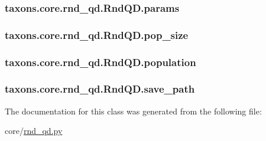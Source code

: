\subsubsection[{\texorpdfstring{params}{params}}]{\setlength{\rightskip}{0pt plus 5cm}taxons.\+core.\+rnd\+\_\+qd.\+Rnd\+Q\+D.\+params}\hypertarget{classtaxons_1_1core_1_1rnd__qd_1_1_rnd_q_d_ab7883ce78f8f699d4a2950128bf6dcbb}{}\label{classtaxons_1_1core_1_1rnd__qd_1_1_rnd_q_d_ab7883ce78f8f699d4a2950128bf6dcbb}
\subsubsection[{\texorpdfstring{pop\+\_\+size}{pop_size}}]{\setlength{\rightskip}{0pt plus 5cm}taxons.\+core.\+rnd\+\_\+qd.\+Rnd\+Q\+D.\+pop\+\_\+size}\hypertarget{classtaxons_1_1core_1_1rnd__qd_1_1_rnd_q_d_acdb4373d63480ea935f930d1922a00ed}{}\label{classtaxons_1_1core_1_1rnd__qd_1_1_rnd_q_d_acdb4373d63480ea935f930d1922a00ed}
\subsubsection[{\texorpdfstring{population}{population}}]{\setlength{\rightskip}{0pt plus 5cm}taxons.\+core.\+rnd\+\_\+qd.\+Rnd\+Q\+D.\+population}\hypertarget{classtaxons_1_1core_1_1rnd__qd_1_1_rnd_q_d_a26536113a3e06d86037d64aa7cd6336f}{}\label{classtaxons_1_1core_1_1rnd__qd_1_1_rnd_q_d_a26536113a3e06d86037d64aa7cd6336f}
\subsubsection[{\texorpdfstring{save\+\_\+path}{save_path}}]{\setlength{\rightskip}{0pt plus 5cm}taxons.\+core.\+rnd\+\_\+qd.\+Rnd\+Q\+D.\+save\+\_\+path}\hypertarget{classtaxons_1_1core_1_1rnd__qd_1_1_rnd_q_d_a5a167ccb3dc6197892bd2e87d8d239ef}{}\label{classtaxons_1_1core_1_1rnd__qd_1_1_rnd_q_d_a5a167ccb3dc6197892bd2e87d8d239ef}


The documentation for this class was generated from the following file\+:\begin{DoxyCompactItemize}
\item 
core/\hyperlink{rnd__qd_8py}{rnd\+\_\+qd.\+py}\end{DoxyCompactItemize}
